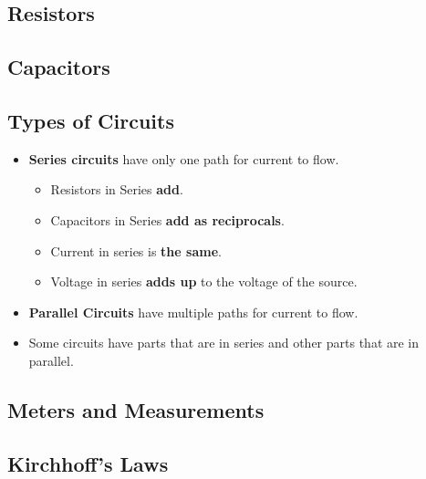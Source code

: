 \documentclass[letterpaper, 12pt]{article}
\begin{document}
\subsection*{Resistors}
	

\subsection*{Capacitors}

\subsection*{Types of Circuits}
	\begin{itemize}
		\item \textbf{Series circuits} have only one path for current to flow.
			\begin{itemize}
				\item Resistors in Series \textbf{add}.
				\item Capacitors in Series \textbf{add as reciprocals}.
				\item Current in series is \textbf{the same}.
				\item Voltage in series \textbf{adds up} to the voltage of the source. 
			\end{itemize}
		\item \textbf{Parallel Circuits} have multiple paths for current to flow. 
		\item Some circuits have parts that are in series and other parts that are in parallel.
	\end{itemize}
\subsection*{Meters and Measurements}

\subsection*{Kirchhoff's Laws}


 
\end{document}

